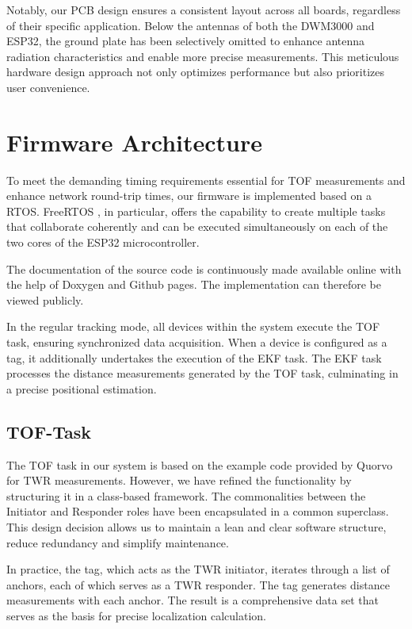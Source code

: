 \documentclass[10pt,a4paper,twocolumn]{article}
\begin{document}
Notably, our PCB design ensures a consistent layout across all boards,
regardless of their specific application.
Below the antennas of both the DWM3000 and ESP32,
the ground plate has been selectively omitted to enhance antenna radiation
characteristics and enable more precise measurements.
This meticulous hardware design approach not only optimizes
performance but also prioritizes user convenience. 

\section{Firmware Architecture}\label{section:firmware}
To meet the demanding timing requirements essential for \ac{TOF}
measurements and enhance network round-trip times,
our firmware is implemented based on a \ac{RTOS}.
FreeRTOS \cite{FreeRTOS_2023}, in particular,
offers the capability to create multiple tasks that collaborate coherently
and can be executed simultaneously on each of the two cores of the ESP32 microcontroller.

The documentation of the source code is continuously made available online with the help of Doxygen and Github pages.
The implementation can therefore be viewed publicly\cite{doxygen-doku}.

In the regular tracking mode,
all devices within the system execute the TOF task, ensuring synchronized data acquisition.
When a device is configured as a tag,
it additionally undertakes the execution of the \ac{EKF} task.
The \ac{EKF} task processes the distance measurements generated by the TOF task,
culminating in a precise positional estimation.

\subsection{TOF-Task}\label{section:firmware-tof}
The \ac{TOF} task in our system is based on the example code
provided by Quorvo for \ac{TWR} measurements.
However, we have refined the functionality by structuring it in a class-based framework.
The commonalities between the Initiator and Responder roles have been
encapsulated in a common superclass.
This design decision allows us to maintain a lean and clear software structure,
reduce redundancy and simplify maintenance.

In practice, the tag, which acts as the \ac{TWR} initiator,
iterates through a list of anchors, each of which serves as a \ac{TWR} responder.
The tag generates distance measurements with each anchor.
The result is a comprehensive data set that serves as the basis for precise localization calculation.
\end{document}
